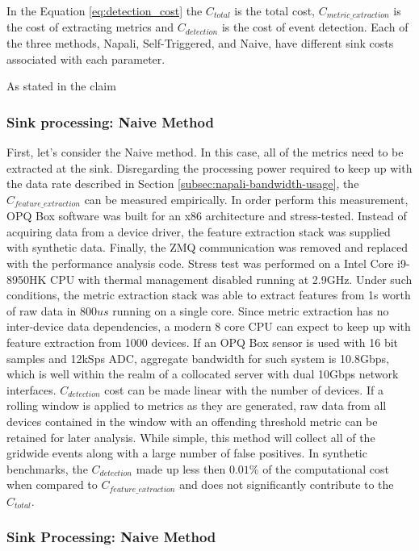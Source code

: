 In the Equation \ref{eq:detection_cost} the $C_{total}$ is the total cost, $C_{metric\_extraction}$ is the cost of extracting metrics and $C_{detection}$ is the cost of event detection.\cite{de2015effective}
Each of the three methods, Napali, Self-Triggered, and Naive, have different sink costs associated with each parameter.

As stated in the claim

\subsubsection{Sink processing: Naive Method}

First, let's consider the Naive method.
In this case, all of the metrics need to be extracted at the sink.
Disregarding the processing power required to keep up with the data rate described in Section \ref{subsec:napali-bandwidth-usage}, the $C_{feature\_extraction}$ can be measured empirically.
In order perform this measurement, OPQ Box software was built for an x86 architecture and stress-tested.
Instead of acquiring data from a device driver, the feature extraction stack was supplied with synthetic data.
Finally, the ZMQ communication was removed and replaced with the performance analysis code.
Stress test was performed on a Intel Core i9-8950HK CPU with thermal management disabled running at 2.9GHz.
Under such conditions, the metric extraction stack was able to extract features from 1s worth of raw data in $800us$ running on a single core.
Since metric extraction has no inter-device data dependencies, a modern 8 core CPU can expect to keep up with feature extraction from 1000 devices.
If an OPQ Box sensor is used with 16 bit samples and 12kSps ADC, aggregate bandwidth for such system is 10.8Gbps, which is well within the realm of a collocated server with dual 10Gbps network interfaces.
$C_{detection}$ cost can be made linear with the number of devices.
If a rolling window is applied to metrics as they are generated, raw data from all devices contained in the window with an offending threshold metric can be retained for later analysis.
While simple, this method will collect all of the gridwide events along with a large number of false positives.
In synthetic benchmarks, the $C_{detection}$ made up less then $0.01\%$ of the computational cost when compared to $C_{feature\_extraction}$
and does not significantly contribute to the $C_{total}$.

\subsubsection{Sink Processing: Naive Method}


